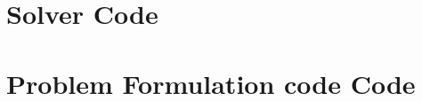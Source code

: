 \documentclass[MTech]{iitmdiss}
\begin{document}
\section{Solver Code}

\pagebreak
\section{Problem Formulation code Code}

\pagebreak

\pagebreak

\pagebreak

\pagebreak

\pagebreak

\pagebreak

\pagebreak
%  	
%	

\begin{thebibliography}{9}

\end{thebibliography}
\end{document}
